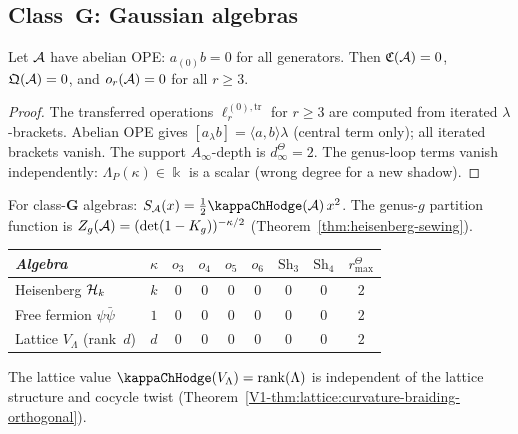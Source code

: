 
\subsection{Class~$\mathbf{G}$: Gaussian algebras}

\begin{theorem}
\ClaimStatusProvedHere
{}
Let $\mathcal{A}$ have abelian OPE: $a_{(0)}b = 0$ for all generators.
Then $\mathfrak{C}(\mathcal{A}) = 0$, $\mathfrak{Q}(\mathcal{A}) = 0$, and
$o_r(\mathcal{A}) = 0$ for all $r \geq 3$.
\end{theorem}

\begin{proof}
The transferred operations $\ell_r^{(0),\mathrm{tr}}$ for
$r \geq 3$ are computed from iterated $\lambda$-brackets.
Abelian OPE gives $[a_\lambda b] = \langle a,b\rangle\lambda$
(central term only); all iterated brackets vanish.
The support \(A_\infty\)-depth is \(d^\Theta_\infty=2\).
The genus-loop terms vanish independently:
$\Lambda_P(\kappa) \in \Bbbk$ is a scalar (wrong
degree for a new shadow).
\end{proof}

\begin{corollary}
\ClaimStatusProvedHere
For class-$\mathbf{G}$ algebras:
$S_\cA(x) = \frac{1}{2}\kappaChHodge(\cA)\,x^2$.
The genus-$g$ partition function is
$Z_g(\mathcal{A}) = (\det(1 - K_g))^{-\kappa/2}$
\textup{(}Theorem~\ref{thm:heisenberg-sewing}\textup{)}.
\end{corollary}

\begin{example}
\begin{center}
\small
\renewcommand{\arraystretch}{1.15}
\begin{tabular}{lcccccccc}
\toprule
\emph{Algebra} & $\kappa$ & $o_3$ & $o_4$ & $o_5$ &
 $o_6$ & $\mathrm{Sh}_3$ & $\mathrm{Sh}_4$ & \(r^\Theta_{\max}\) \\
\midrule
Heisenberg $\mathcal{H}_k$ & $k$ & $0$ & $0$ & $0$ & $0$ &
 $0$ & $0$ & $2$ \\
Free fermion $\psi\bar\psi$ & $1$ & $0$ & $0$ & $0$ & $0$ &
 $0$ & $0$ & $2$ \\
Lattice $V_\Lambda$ (rank~$d$) & $d$ & $0$ & $0$ & $0$ & $0$ &
 $0$ & $0$ & $2$ \\
\bottomrule
\end{tabular}
\end{center}
The lattice value $\kappaChHodge(V_\Lambda) = \mathrm{rank}(\Lambda)$
is independent of the lattice structure and cocycle twist
(Theorem~\ref{V1-thm:lattice:curvature-braiding-orthogonal}).
\end{example}


